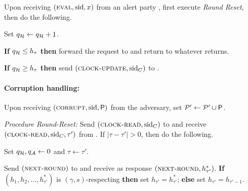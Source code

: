 \begin{cccFunctionality}
\begin{cccItemize}[nosep]
        \item Upon receiving $(\textsc{eval}, \mathrm{sid}, x)$ from an alert party \party, first execute \textit{Round Reset}, then do the following.
        \begin{cccEnum}[nosep]
            \item Set $q_\mathcal{H} \gets q_\mathcal{H} + 1$.
            \item \textbf{If} $q_\mathcal{H} \le h_\tau$ \textbf{then} forward the request to \funcRO and return to \party whatever \funcRO returns.
            \item \textbf{If} $q_\mathcal{H} \ge h_\tau$ \textbf{then} send $(\textsc{clock-update}, \mathrm{sid}_C)$ to \funcImpClock.
        \end{cccEnum}
    \end{cccItemize}

    \paragraph{Corruption handling:}
    \begin{cccItemize}[nosep]
        \item Upon receiving $(\textsc{corrupt}, \mathrm{sid}, \mathsf{P})$ from the adversary, set $\mathcal{P}' \gets \mathcal{P}' \cup \mathsf{P}$.
    \end{cccItemize}

    \medskip\emph{Procedure Round-Reset:}
    Send $(\textsc{clock-read}, \mathrm{sid}_C)$ to \funcImpClock and receive $(\textsc{clock-read}, \allowbreak \mathrm{sid}_C, \tau')$ from \funcImpClock. If $|\tau - \tau' | > 0$, then do the following.
    \begin{cccEnum}[nosep]
        \item Set $q_\mathcal{H}, q_\mathcal{A} \gets 0$ and $\tau \gets \tau'$.

        \item Send $(\textsc{next-round})$ to \adv and receive as response $(\textsc{next-round}, h^*_{\tau'})$.
        \textbf{If} $(h_1, h_2, \ldots, h^*_{\tau'})$ is $(\gamma, s)$-respecting \textbf{then} set $h_{\tau'} = h^*_{\tau'}$; \textbf{else} set $h_{\tau'} = h_{\tau' - 1}$.
    \end{cccEnum}
\end{cccFunctionality}

